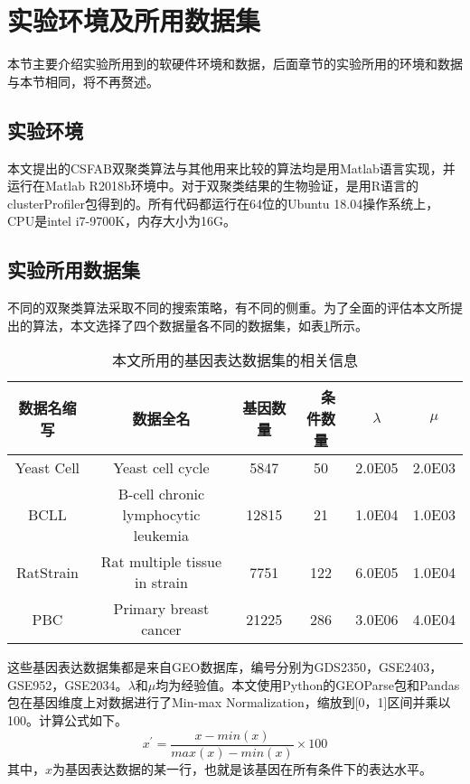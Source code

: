 \section{实验环境及所用数据集}
本节主要介绍实验所用到的软硬件环境和数据，后面章节的实验所用的环境和数据与本节相同，将不再赘述。
    \subsection{实验环境}
    本文提出的CSFAB双聚类算法与其他用来比较的算法均是用Matlab语言实现，并运行在Matlab R2018b环境中。对于双聚类结果的生物验证，是用R语言的clusterProfiler包得到的。所有代码都运行在64位的Ubuntu 18.04操作系统上，CPU是intel i7-9700K，内存大小为16G。

    \subsection{实验所用数据集}
    不同的双聚类算法采取不同的搜索策略，有不同的侧重。为了全面的评估本文所提出的算法，本文选择了四个数据量各不同的数据集，如表\ref{tab:data}所示。
    \begin{table}[htbp]
    \caption{本文所用的基因表达数据集的相关信息}\label{tab:data}
    \vspace{0.5em}\centering\wuhao
    \begin{tabular}{cccccc}
    \toprule[1.5pt]
    数据名缩写 & 数据全名 & 基因数量 &　条件数量 & $\lambda$& $\mu$ \\
    \midrule[1pt]
    Yeast Cell & Yeast cell cycle & 5847& 50 & 2.0E05 &  2.0E03\\
    BCLL & B-cell chronic lymphocytic leukemia& 12815& 21 & 1.0E04 & 1.0E03\\
    RatStrain & Rat multiple tissue in strain& 7751& 122 & 6.0E05 & 1.0E04\\
    PBC & Primary breast cancer& 21225& 286 & 3.0E06 & 4.0E04\\
    \bottomrule[1.5pt]
    \end{tabular}
    \end{table}
    这些基因表达数据集都是来自GEO数据库，编号分别为GDS2350，GSE2403，GSE952，GSE2034。$\lambda$和$\mu$均为经验值。本文使用Python的GEOParse包和Pandas包在基因维度上对数据进行了Min-max Normalization，缩放到[0，1]区间并乘以100。计算公式如下。
    \begin{equation}
        x^{\prime} = \frac{x - min(x)}{max(x) - min(x)} \times 100
    \end{equation}
    其中，$x$为基因表达数据的某一行，也就是该基因在所有条件下的表达水平。

